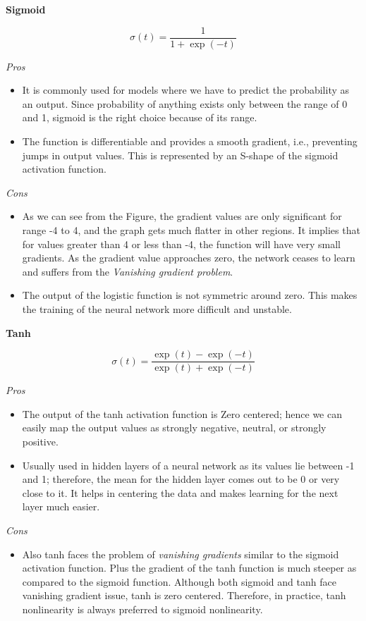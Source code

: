 \textbf{Sigmoid}

$$\sigma(t)=\displaystyle\frac{1}{1+\exp(-t)}$$

\textit{Pros}

\begin{itemize}
  \item It is commonly used for models where we have to predict the probability as an
output. Since probability of anything exists only between the range of 0 and 1,
sigmoid is the right choice because of its range.
  \item The function is differentiable and provides a smooth gradient, i.e., preventing
jumps in output values. This is represented by an S-shape of the sigmoid activation function.
\end{itemize}

\textit{Cons}

\begin{itemize}
  \item As we can see from the Figure, the gradient values are only significant for
range -4 to 4, and the graph gets much flatter in other regions.
It implies that for values greater than 4 or less than -4, the function will have very
small gradients. As the gradient value approaches zero, the network ceases to learn
and suffers from the \textit{Vanishing gradient problem}.
  \item The output of the logistic function is not symmetric around zero. This makes the training of the
neural network more difficult and unstable.
\end{itemize}

\textbf{Tanh}

$$\sigma(t)=\displaystyle\frac{\exp(t)-\exp(-t)}{\exp(t)+\exp(-t)}$$

\textit{Pros}

\begin{itemize}
  \item The output of the tanh activation function is Zero centered; hence we can
easily map the output values as strongly negative, neutral, or strongly positive.
  \item Usually used in hidden layers of a neural network as its values lie between -1 and 1; therefore, the mean for the hidden layer comes out to be 0 or very close to
it. It helps in centering the data and makes learning for the next layer much
easier.
\end{itemize}

\textit{Cons}

\begin{itemize}
  \item Also tanh faces the problem of \textit{vanishing gradients} similar to the
sigmoid activation function. Plus the gradient of the tanh function is much steeper as
compared to the sigmoid function.
Although both sigmoid and tanh face vanishing gradient issue, tanh is
zero centered.
Therefore, in practice, tanh nonlinearity is always preferred to sigmoid
nonlinearity.
\end{itemize}

